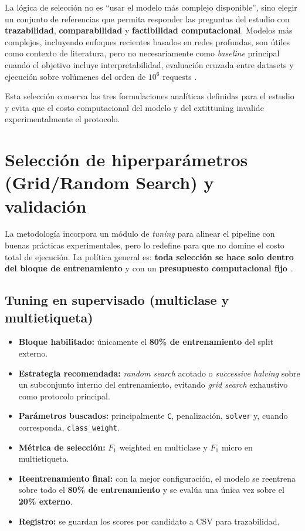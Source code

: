 \documentclass[12pt,oneside]{report}
\begin{document}
La lógica de selección no es ``usar el modelo más complejo disponible'', sino elegir un conjunto de referencias que permita responder las preguntas del estudio con \textbf{trazabilidad}, \textbf{comparabilidad} y \textbf{factibilidad computacional}. Modelos más complejos, incluyendo enfoques recientes basados en redes profundas, son útiles como contexto de literatura, pero no necesariamente como \textit{baseline} principal cuando el objetivo incluye interpretabilidad, evaluación cruzada entre datasets y ejecución sobre volúmenes del orden de $10^6$ requests \cite{fang_2024,zhou_2024}.

Esta selección conserva las tres formulaciones analíticas definidas para el estudio y evita que el costo computacional del modelo y del 	extit{tuning} invalide experimentalmente el protocolo.

\section{Selección de hiperparámetros (Grid/Random Search) y validación}
La metodología incorpora un módulo de \textit{tuning} para alinear el pipeline con buenas prácticas experimentales, pero lo redefine para que no domine el costo total de ejecución. La política general es: \textbf{toda selección se hace solo dentro del bloque de entrenamiento} y con un \textbf{presupuesto computacional fijo} \cite{sklearn_randomsearch,sklearn_halving}.

\subsection{Tuning en supervisado (multiclase y multietiqueta)}
\begin{itemize}[leftmargin=*]
  \item \textbf{Bloque habilitado:} únicamente el \textbf{80\% de entrenamiento} del split externo.
  \item \textbf{Estrategia recomendada:} \textit{random search} acotado o \textit{successive halving} sobre un subconjunto interno del entrenamiento, evitando \textit{grid search} exhaustivo como protocolo principal.
  \item \textbf{Parámetros buscados:} principalmente \texttt{C}, penalización, \texttt{solver} y, cuando corresponda, \texttt{class\_weight}.
  \item \textbf{Métrica de selección:} $F_1$ weighted en multiclase y $F_1$ micro en multietiqueta.
  \item \textbf{Reentrenamiento final:} con la mejor configuración, el modelo se reentrena sobre todo el \textbf{80\% de entrenamiento} y se evalúa una única vez sobre el \textbf{20\% externo}.
  \item \textbf{Registro:} se guardan los scores por candidato a CSV para trazabilidad.
\end{itemize}
\end{document}
